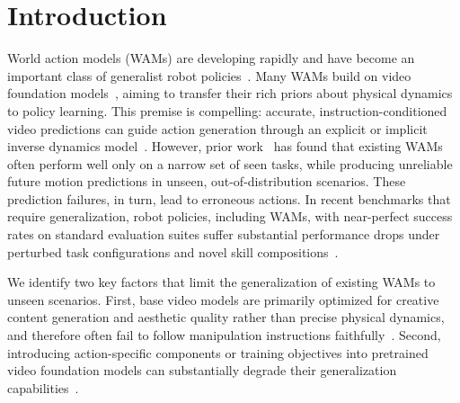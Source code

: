 \section{Introduction}
\vspace{-2mm}

World action models (WAMs) are developing rapidly and have become an important class of generalist robot policies~\citep{hu2024video,liao2025genie,kim2026cosmospolicy,yuan2026fastwam,ma2026dit4dit,li2026lingbotva,li2026wallwm,agibot2026geact2,ye2026dreamzero}. Many WAMs build on video foundation models~\citep{wan2025wan,agarwal2025cosmos,yang2025cogvideox}, aiming to transfer their rich priors about physical dynamics to policy learning. This premise is compelling: accurate, instruction-conditioned video predictions can guide action generation through an explicit or implicit inverse dynamics model~\citep{du2024learning,hu2024video}. However, prior work~\citep{zhang2026qwen} has found that existing WAMs often perform well only on a narrow set of seen tasks, while producing unreliable future motion predictions in unseen, out-of-distribution scenarios. These prediction failures, in turn, lead to erroneous actions. In recent benchmarks that require generalization, robot policies, including WAMs, with near-perfect success rates on standard evaluation suites suffer substantial performance drops under perturbed task configurations and novel skill compositions~\citep{zhou2025liberopro,li2025vlas,mishra2026understanding}.

We identify two key factors that limit the generalization of existing WAMs to unseen scenarios. First, base video models are primarily optimized for creative content generation and aesthetic quality rather than precise physical dynamics, and therefore often fail to follow manipulation instructions faithfully~\citep{chen2025large,zhang2026qwen}. Second, introducing action-specific components or training objectives into pretrained video foundation models can substantially degrade their generalization capabilities~\citep{mishra2026understanding}.

